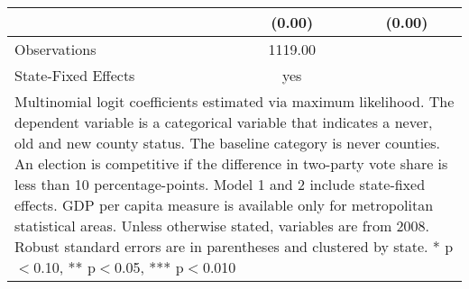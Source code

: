 \begin{table}[!htbp]
\begin{tabular}{l*{2}{c}}
                    &      (0.00)   &      (0.00)   \\
\hline
Observations        &     1119.00   &               \\
State-Fixed Effects &         yes   &               \\
\hline\hline
\multicolumn{3}{p{\linewidth}}{\footnotesize Multinomial logit coefficients estimated via maximum likelihood. The dependent variable is a categorical variable that indicates a never, old and new county status. The baseline category is never counties. An election is competitive if the difference in two-party vote share is less than 10 percentage-points. Model 1 and 2 include state-fixed effects. GDP per capita measure is available only for metropolitan statistical areas. Unless otherwise stated, variables are from 2008. Robust standard errors are in parentheses and clustered by state. * p$<$0.10, ** p$<$0.05, *** p$<$0.010}\\
\end{tabular}
\end{table}
